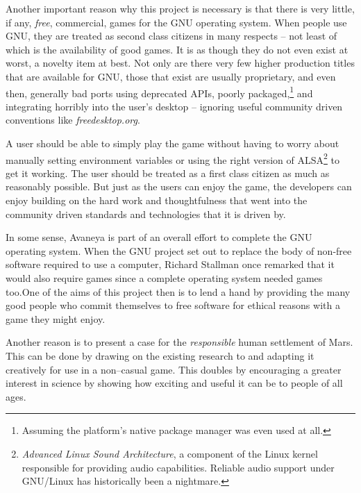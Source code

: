 Another important reason why this project is necessary is that there is very little, if any, {\it free}, commercial, games for the GNU operating system. When people use GNU, they are treated as second class citizens in many respects -- not least of which is the availability of good games. It is as though they do not even exist at worst, a novelty item at best. Not only are there very few higher production titles that are available for GNU, those that exist are usually proprietary, and even then, generally bad ports using deprecated APIs, poorly packaged,\footnote{Assuming the platform's native package manager was even used at all.} and integrating horribly into the user's desktop -- ignoring useful community driven conventions like {\it freedesktop.org}. 

A user should be able to simply play the game without having to worry about manually setting environment variables or using the right version of ALSA\footnote{{\it Advanced Linux Sound Architecture}, a component of the Linux kernel responsible for providing audio capabilities. Reliable audio support under GNU/Linux has historically been a nightmare.} to get it working. The user should be treated as a first class citizen as much as reasonably possible. But just as the users can enjoy the game, the developers can enjoy building on the hard work and thoughtfulness that went into the community driven standards and technologies that it is driven by.

In some sense, Avaneya is part of an overall effort to complete the GNU operating system. When the GNU project set out to replace the body of non-free software required to use a computer, Richard Stallman once remarked that it would also require games since a complete operating system needed games too. One of the aims of this project then is to lend a hand by providing the many good people who commit themselves to free software for ethical reasons with a game they might enjoy.

Another reason is to present a case for the {\it responsible} human settlement of Mars. This can be done by drawing on the existing research to and adapting it creatively for use in a non--casual game. This doubles by encouraging a greater interest in science by showing how exciting and useful it can be to people of all ages.


